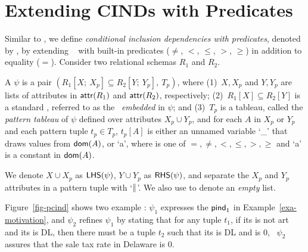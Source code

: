 

\section{Extending CINDs with Predicates}
\label{sec-cind}



Similar to \pCFDs, we define {\em conditional inclusion dependencies with predicates}, denoted by \pCINDs,
by extending \CINDs~\cite{tcs-CINDs} with built-in predicates ($\ne$, $<$, $\le$, $>$, $\ge$) in addition to equality ($=$).
%
Consider two relational schemas $R_1$ and $R_2$.

 A \pCIND $\psi$ is a pair
$(R_1[X;\ X_p] \subseteq R_2[Y;\ Y_p],\ T_p)$, where (1)~$X, X_p$
and  $Y, Y_p$ are lists of attributes in $\protect\mathsf{attr}(R_1)$ and
$\protect\mathsf{attr}(R_2)$, respectively; (2)~$R_1[X] \subseteq R_2[Y]$ is a
standard \IND, referred to as the \IND\ {\em embedded} in $\psi$;
and (3)~$T_p$ is a tableau, called the {\em pattern tableau} of
$\psi$ defined over attributes $X_p\cup Y_p$, and for each $A$ in
$X_p$ or $Y_p$ and each pattern tuple $t_p \in T_p$, $t_p[A]$ is either
an unnamed variable `\_' that draws values from $\protect\mathsf{dom}(A)$, or
`\op a', where \op is one of $=, \ne, <, \le, >, \ge$ and `a' is a
constant in $\protect\mathsf{dom}(A)$.

 We denote $X \cup X_p$ as ${\mathsf{LHS}}(\psi)$, $Y \cup Y_p$ as ${\mathsf{RHS}}(\psi)$, and
separate the $X_p$ and $Y_p$ attributes in a pattern tuple with
`$\parallel$'. We also use  to denote an {\em empty} list. 



\vspace{-0.5ex}
\begin{example}
\label{exam-pcind} Figure~\ref{fig-pcind} shows two example \pCINDs:
$\psi_1$ expresses the ${\mathsf{pind}}_1$ in Example~\ref{exa-motivation},
and $\psi_2$ refines $\psi_1$ by stating that for any 
tuple $t_1$, if its  is not art and its  is DL,
then there must be a  tuple $t_2$ such that its 
is DL and  is $0$, \ie~$\psi_2$ assures that the sale tax
rate in Delaware is 0.
\end{example}
\vspace{-1ex}






